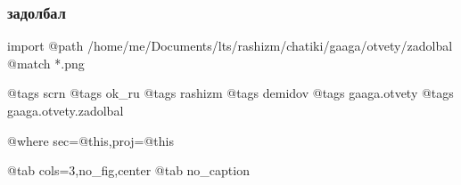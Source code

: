  
 
 
 
 

\subsubsection{задолбал}

\ifcmt
  import
    @path /home/me/Documents/lts/rashizm/chatiki/gaaga/otvety/zadolbal
    @match *.png

    @tags scrn
    @tags ok_ru
    @tags rashizm
    @tags demidov
    @tags gaaga.otvety
    @tags gaaga.otvety.zadolbal

    @where sec=@this,proj=@this
  
    @tab cols=3,no_fig,center
    @tab no_caption
\fi
